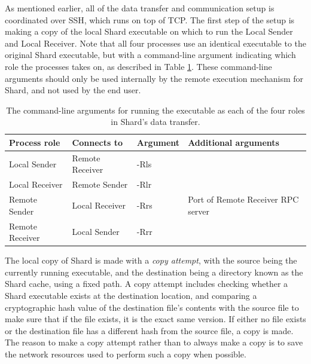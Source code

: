 \documentclass[oneside]{report}
\begin{document}
As mentioned earlier, all of the data transfer and communication setup is coordinated over SSH, which runs on top of TCP.
The first step of the setup is making a copy of the local Shard executable on which to run the Local Sender and Local Receiver.
Note that all four processes use an identical executable to the original Shard executable, but with a command-line argument indicating which role the processes takes on, as described in Table \ref{fig:process_role_args}.
These command-line arguments should only be used internally by the remote execution mechanism for Shard, and not used by the end user.

\begin{table}[h]
  \begin{center}
    \begin{tabular}{|l|l|l|l|}
      \hline
      Process role    & Connects to     & Argument & Additional arguments               \\ \hline
      Local Sender    & Remote Receiver & -Rls     &                                    \\ \hline
      Local Receiver  & Remote Sender   & -Rlr     &                                    \\ \hline
      Remote Sender   & Local Receiver  & -Rrs     & Port of Remote Receiver RPC server \\ \hline
      Remote Receiver & Local Sender    & -Rrr     &                                    \\ \hline
    \end{tabular}
    \caption{The command-line arguments for running the executable as each of the four roles in Shard's data transfer.}
    \label{fig:process_role_args}
  \end{center}
\end{table}


The local copy of Shard is made with a \textit{copy attempt}, with the source being the currently running executable, and the destination being a directory known as the Shard cache, using a fixed path.
A copy attempt includes checking whether a Shard executable exists at the destination location, and comparing a cryptographic hash value of the destination file's contents with the source file to make sure that if the file exists, it is the exact same version.
If either no file exists or the destination file has a different hash from the source file, a copy is made.
The reason to make a copy attempt rather than to always make a copy is to save the network resources used to perform such a copy when possible.
\end{document}
